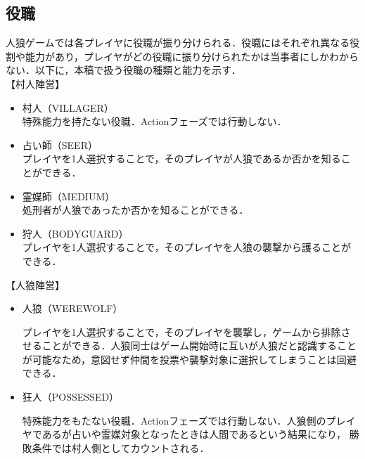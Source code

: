 \documentclass{jarticle}
\begin{document}
\subsection{役職}
人狼ゲームでは各プレイヤに役職が振り分けられる．役職にはそれぞれ異なる役割や能力があり，プレイヤがどの役職に振り分けられたかは当事者にしかわからない．以下に，本稿で扱う役職の種類と能力を示す．\\
【村人陣営】\\
\vspace{-1.5\baselineskip}
\begin{itemize}
\setlength{\leftskip}{-1zw}
  \setlength{\parskip}{0cm}
  \setlength{\itemsep}{0cm}
\item 村人（VILLAGER）\\
特殊能力を持たない役職．Actionフェーズでは行動しない．
\item 占い師（SEER）\\
プレイヤを1人選択することで，そのプレイヤが人狼であるか否かを知ることができる．
\item 霊媒師（MEDIUM）\\
処刑者が人狼であったか否かを知ることができる．
\item 狩人（BODYGUARD）\\
プレイヤを1人選択することで，そのプレイヤを人狼の襲撃から護ることができる．
\end{itemize}
【人狼陣営】\\
\vspace{-1.5\baselineskip}
\begin{itemize}
\setlength{\leftskip}{-1zw}
  \setlength{\parskip}{0cm}
  \setlength{\itemsep}{0cm}
\item 人狼（WEREWOLF）\par
プレイヤを1人選択することで，そのプレイヤを襲撃し，ゲームから排除させることができる．人狼同士はゲーム開始時に互いが人狼だと認識することが可能なため，意図せず仲間を投票や襲撃対象に選択してしまうことは回避できる．
\item 狂人（POSSESSED）\par
特殊能力をもたない役職．Actionフェーズでは行動しない．人狼側のプレイヤであるが占いや霊媒対象となったときは人間であるという結果になり， 勝敗条件では村人側としてカウントされる．
\end{itemize}
\end{document}
